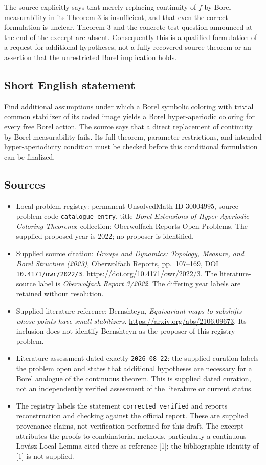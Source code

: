 \documentclass[11pt]{article}
\begin{document}
The source explicitly says that merely replacing continuity of \(f\) by Borel measurability in its Theorem 3 is insufficient, and that even the correct formulation is unclear. Theorem 3 and the concrete test question announced at the end of the excerpt are absent. Consequently this is a qualified formulation of a request for additional hypotheses, not a fully recovered source theorem or an assertion that the unrestricted Borel implication holds.
\subsection{Short English statement}
Find additional assumptions under which a Borel symbolic coloring with trivial common stabilizer of its coded image yields a Borel hyper-aperiodic coloring for every free Borel action. The source says that a direct replacement of continuity by Borel measurability fails. Its full theorem, parameter restrictions, and intended hyper-aperiodicity condition must be checked before this conditional formulation can be finalized.
\subsection{Sources}
\begin{itemize}
\item Local problem registry: permanent UnsolvedMath ID \(30004995\), source problem code \texttt{catalogue entry}, title \emph{Borel Extensions of Hyper-Aperiodic Coloring Theorems}; collection: Oberwolfach Reports Open Problems. The supplied proposed year is 2022; no proposer is identified.
\item Supplied source citation: \emph{Groups and Dynamics: Topology, Measure, and Borel Structure (2023)}, Oberwolfach Reports, pp.\ 107--169, DOI \texttt{10.4171/owr/2022/3}. \url{https://doi.org/10.4171/owr/2022/3}. The literature-source label is \emph{Oberwolfach Report 3/2022}. The differing year labels are retained without resolution.
\item Supplied literature reference: Bernshteyn, \emph{Equivariant maps to subshifts whose points have small stabilizers}. \url{https://arxiv.org/abs/2106.09673}. Its inclusion does not identify Bernshteyn as the proposer of this registry problem.
\item Literature assessment dated exactly \texttt{2026-08-22}: the supplied curation labels the problem open and states that additional hypotheses are necessary for a Borel analogue of the continuous theorem. This is supplied dated curation, not an independently verified assessment of the literature or current status.
\item The registry labels the statement \texttt{corrected\_verified} and reports reconstruction and checking against the official report. These are supplied provenance claims, not verification performed for this draft. The excerpt attributes the proofs to combinatorial methods, particularly a continuous Lov\'asz Local Lemma cited there as reference [1]; the bibliographic identity of [1] is not supplied.
\end{itemize}
\end{document}
